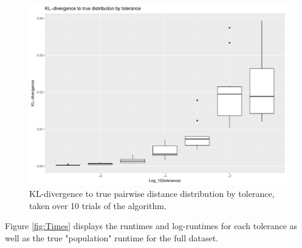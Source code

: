 \documentclass{article}
\begin{document}
\begin{figure}
    \includegraphics[width=\linewidth]{Figures/div_by_tol.pdf}
    \caption{KL-divergence to true pairwise distance distribution by tolerance, taken over 10 trials of the algorithm.}
    \label{fig:Divergences}
\end{figure}
Figure \ref{fig:Times} displays the runtimes and log-runtimes for each tolerance as well as the true "population" runtime for the full dataset.
\end{document}

